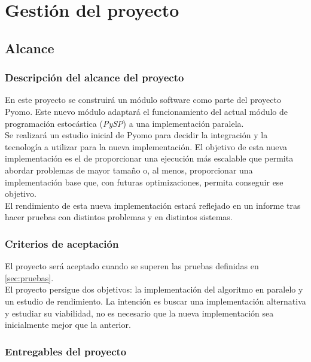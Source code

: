\chapter{Gestión del proyecto}
\label{ch:gestion}

\section{Alcance}

\subsection{Descripción del alcance del proyecto}

En este proyecto se construirá un módulo software como parte del proyecto Pyomo. Este nuevo módulo adaptará el funcionamiento del actual módulo de programación estocástica (\textit{PySP}) a una implementación paralela.\\

Se realizará un estudio inicial de Pyomo para decidir la integración y la tecnología a utilizar para la nueva implementación. El objetivo de esta nueva implementación es el de proporcionar una ejecución más escalable que permita abordar problemas de mayor tamaño o, al menos, proporcionar una implementación base que, con futuras optimizaciones, permita conseguir ese objetivo.\\

El rendimiento de esta nueva implementación estará reflejado en un informe tras hacer pruebas con distintos problemas y en distintos sistemas.

\subsection{Criterios de aceptación}

El proyecto será aceptado cuando se superen las pruebas definidas en \autoref{sec:pruebas}.\\

El proyecto persigue dos objetivos: la implementación del algoritmo en paralelo y un estudio de rendimiento. La intención es buscar una implementación alternativa y estudiar su viabilidad, no es necesario que la nueva implementación sea inicialmente mejor que la anterior.

\subsection{Entregables del proyecto}

